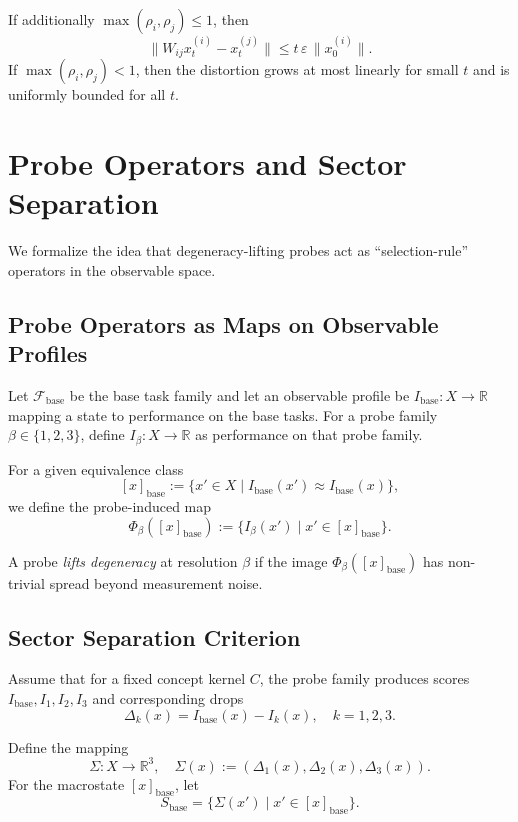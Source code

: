 \documentclass[11pt]{article}
\begin{document}
\begin{corollary}
\label{cor:bounded-contraction}
If additionally $\max(\rho_i,\rho_j) \le 1$, then
\[
  \| W_{ij} x^{(i)}_t - x^{(j)}_t \| \le t\,\varepsilon \,\|x^{(i)}_0\|.
\]
If $\max(\rho_i,\rho_j) < 1$, then the distortion grows at most linearly for small $t$ and is uniformly bounded for all $t$.
\end{corollary}

\section{Probe Operators and Sector Separation}

We formalize the idea that degeneracy-lifting probes act as ``selection-rule'' operators in the observable space.

\subsection{Probe Operators as Maps on Observable Profiles}

Let $\mathcal{F}_{\text{base}}$ be the base task family and let an observable profile be $I_{\text{base}}: X \to \mathbb{R}$ mapping a state to performance on the base tasks. For a probe family $\beta \in \{1,2,3\}$, define $I_\beta: X \to \mathbb{R}$ as performance on that probe family.

\begin{definition}
For a given equivalence class
\[
  [x]_{\text{base}} := \{x' \in X \mid I_{\text{base}}(x') \approx I_{\text{base}}(x)\},
\]
we define the probe-induced map
\[
  \Phi_\beta([x]_{\text{base}}) := \{ I_\beta(x') \mid x' \in [x]_{\text{base}} \}.
\]
\end{definition}

A probe \emph{lifts degeneracy} at resolution $\beta$ if the image $\Phi_\beta([x]_{\text{base}})$ has non-trivial spread beyond measurement noise.

\subsection{Sector Separation Criterion}

Assume that for a fixed concept kernel $C$, the probe family produces scores $I_{\text{base}}, I_1, I_2, I_3$ and corresponding drops
\[
  \Delta_k(x) = I_{\text{base}}(x) - I_k(x), \quad k=1,2,3.
\]

\begin{definition}
Define the mapping
\[
  \Sigma: X \to \mathbb{R}^3, \quad \Sigma(x) := (\Delta_1(x), \Delta_2(x), \Delta_3(x)).
\]
For the macrostate $[x]_{\text{base}}$, let
\[
  S_{\text{base}} = \{ \Sigma(x') \mid x' \in [x]_{\text{base}} \}.
\]
\end{definition}
\end{document}
